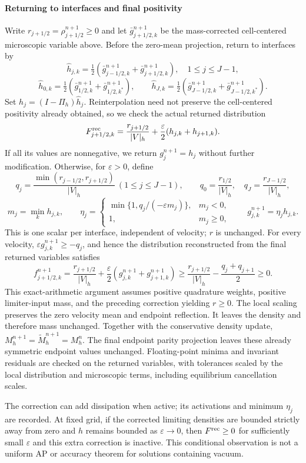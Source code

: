 \documentclass[11pt,twoside]{article}
\numberwithin{equation}{section}
\theoremstyle{plain}
\theoremstyle{nonumberplain}
\newif\ifrevisionred
\newenvironment{revisionblock}{\begingroup\ifrevisionred\color{red}\fi}{\endgroup}
\begin{document}
\begin{revisionblock}
\paragraph{Returning to interfaces and final positivity}
Write $r_{j+1/2}=\rho_{j+1/2}^{n+1}\ge0$ and let $\bar g_{j+1/2,k}^{n+1}$
be the mass-corrected cell-centered microscopic variable above. Before the
zero-mean projection, return to interfaces by
\[
\widehat h_{j,k}=\tfrac12(\bar g_{j-1/2,k}^{n+1}+\bar g_{j+1/2,k}^{n+1}),
\quad 1\le j\le J-1,
\]
\[
\widehat h_{0,k}=\tfrac12(\bar g_{1/2,k}^{n+1}+\bar g_{1/2,k^*}^{n+1}),\qquad
\widehat h_{J,k}=\tfrac12(\bar g_{J-1/2,k}^{n+1}+\bar g_{J-1/2,k^*}^{n+1}).
\]
Set $h_j=(I-\Pi_h)\widehat h_j$. Reinterpolation need not preserve the
cell-centered positivity already obtained, so we check the actual returned
distribution
\[
F^{\rm rec}_{j+1/2,k}=\frac{r_{j+1/2}}{|V|_h}
+\frac{\varepsilon}{2}(h_{j,k}+h_{j+1,k}).
\]
If all its values are nonnegative, we return $g_j^{n+1}=h_j$ without further
modification. Otherwise, for $\varepsilon>0$, define
\[
q_j=\frac{\min(r_{j-1/2},r_{j+1/2})}{|V|_h}\ (1\le j\le J-1),\qquad
q_0=\frac{r_{1/2}}{|V|_h},\quad q_J=\frac{r_{J-1/2}}{|V|_h},
\]
\[
m_j=\min_k h_{j,k},\qquad
\eta_j=\begin{cases}
\min\{1,q_j/(-\varepsilon m_j)\},&m_j<0,\\
1,&m_j\ge0,
\end{cases}
\qquad g_{j,k}^{n+1}=\eta_jh_{j,k}.
\]
This is one scalar per interface, independent of velocity; $r$ is unchanged.
For every velocity, $\varepsilon g_{j,k}^{n+1}\ge-q_j$, and hence the
distribution reconstructed from the final returned variables satisfies
\[
f^{n+1}_{j+1/2,k}=\frac{r_{j+1/2}}{|V|_h}
+\frac{\varepsilon}{2}(g_{j,k}^{n+1}+g_{j+1,k}^{n+1})
\ge\frac{r_{j+1/2}}{|V|_h}-\frac{q_j+q_{j+1}}2\ge0.
\]
This exact-arithmetic argument assumes positive quadrature weights, positive
limiter-input mass, and the preceding correction yielding $r\ge0$. The local
scaling preserves the zero velocity mean and endpoint reflection. It leaves
the density and therefore mass unchanged. Together with the conservative
density update, $M_h^{n+1}=\widetilde M_h^{n+1}=M_h^n$. The final endpoint
parity projection leaves these already symmetric endpoint values unchanged.
Floating-point minima and invariant residuals are checked on the returned
variables, with tolerances scaled by the local distribution and microscopic
terms, including equilibrium cancellation scales.

The correction can add dissipation when active; its activations and minimum
$\eta_j$ are recorded. At fixed grid, if the corrected limiting densities
are bounded strictly away from zero and $h$ remains bounded as
$\varepsilon\to0$, then $F^{\rm rec}\ge0$ for sufficiently small
$\varepsilon$ and this extra correction is inactive. This conditional
observation is not a uniform AP or accuracy theorem for solutions containing
vacuum.
\end{revisionblock}



\end{document}
